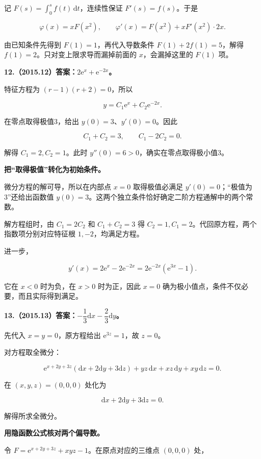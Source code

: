 \documentclass[UTF8,11pt,fontset=windows]{ctexart}
\begin{document}
记 $F(s)=\int_0^s f(t)\,\mathrm dt$，连续性保证 $F'(s)=f(s)$。于是

$$
\varphi(x)=xF(x^2),\qquad
\varphi'(x)=F(x^2)+xF'(x^2)\cdot2x.
$$

由已知条件先得到 $F(1)=1$，再代入导数条件 $F(1)+2f(1)=5$，解得 $f(1)=2$。只对变上限求导而漏掉前面的 $x$，会漏掉这里的 $F(1)$ 项。

\clearpage

\textbf{12.（2015.12）答案：$2\mathrm e^x+\mathrm e^{-2x}$。}

特征方程为 $(r-1)(r+2)=0$，所以

$$
y=C_1\mathrm e^x+C_2\mathrm e^{-2x}.
$$

在零点取得极值3，给出 $y(0)=3$、$y'(0)=0$。因此

$$
C_1+C_2=3,\qquad C_1-2C_2=0.
$$

解得 $C_1=2,C_2=1$。此时 $y''(0)=6>0$，确实在零点取得极小值3。

\textbf{把“取得极值”转化为初始条件。}

微分方程的解可导，所以在内部点 $x=0$ 取得极值必满足 $y'(0)=0$；“极值为3”还给出函数值 $y(0)=3$。这两个独立条件恰好确定二阶方程通解中的两个常数。

解方程组时，由 $C_1=2C_2$ 和 $C_1+C_2=3$ 得 $C_2=1,C_1=2$。代回原方程，两个指数项分别对应特征根 $1,-2$，均满足方程。

进一步，

$$
y'(x)=2\mathrm e^x-2\mathrm e^{-2x}
=2\mathrm e^{-2x}(\mathrm e^{3x}-1).
$$

它在 $x<0$ 时为负，在 $x>0$ 时为正，因此 $x=0$ 确为极小值点，条件不仅必要，而且实际得到满足。

\clearpage

\textbf{13.（2015.13）答案：$-\dfrac13\mathrm dx-\dfrac23\mathrm dy$。}

先代入 $x=y=0$，原方程给出 $\mathrm e^{3z}=1$，故 $z=0$。

对方程取全微分：

$$
\mathrm e^{x+2y+3z}(\mathrm dx+2\mathrm dy+3\mathrm dz)
+yz\,\mathrm dx+xz\,\mathrm dy+xy\,\mathrm dz=0.
$$

在 $(x,y,z)=(0,0,0)$ 处化为

$$
\mathrm dx+2\mathrm dy+3\mathrm dz=0.
$$

解得所求全微分。

\textbf{用隐函数公式核对两个偏导数。}

令 $F=\mathrm e^{x+2y+3z}+xyz-1$。在原点对应的三维点 $(0,0,0)$ 处，
\end{document}
